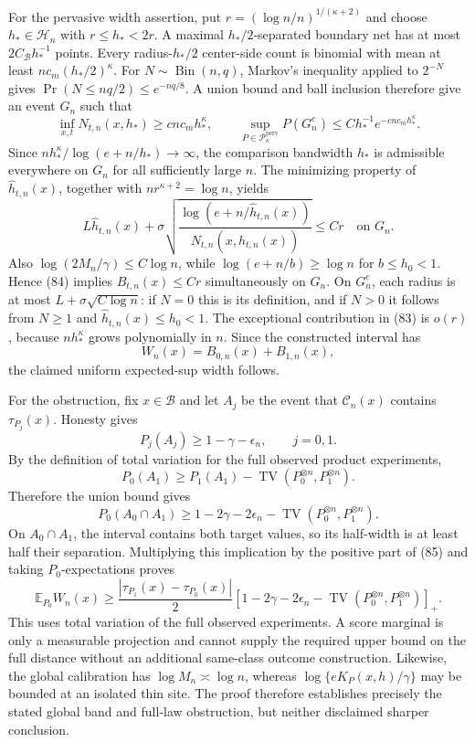 For the pervasive width assertion, put
\(r=(\log n/n)^{1/(\kappa+2)}\) and choose
\(h_*\in\mathcal H_n\) with \(r\le h_*<2r\).  A maximal
\(h_*/2\)-separated boundary net has at most
\(2C_{\mathcal B}h_*^{-1}\) points.  Every radius-\(h_*/2\) center-side
count is binomial with mean at least \(nc_m(h_*/2)^\kappa\).  For
\(N\sim\operatorname{Bin}(n,q)\), Markov's inequality applied to
\(2^{-N}\) gives \(\Pr(N\le nq/2)\le e^{-nq/8}\).  A union bound and
ball inclusion therefore give an event \(G_n\) such that
\[
 \inf_{x,t}N_{t,n}(x,h_*)\ge cn c_mh_*^\kappa,
 \qquad
 \sup_{P\in\mathcal P_\kappa^{\mathrm{perv}}}P(G_n^c)
 \le Ch_*^{-1}e^{-cnc_mh_*^\kappa}. \tag{83}
\]
Since \(nh_*^\kappa/\log(e+n/h_*)\to\infty\), the comparison bandwidth
\(h_*\) is admissible everywhere on \(G_n\) for all sufficiently large
\(n\).  The minimizing property of \(\widehat h_{t,n}(x)\), together
with \(nr^{\kappa+2}=\log n\), yields
\[
 L\widehat h_{t,n}(x)+
 \sigma\sqrt{\frac{\log(e+n/\widehat h_{t,n}(x))}
 {N_{t,n}(x,\widehat h_{t,n}(x))}}
 \le Cr \quad\text{on }G_n. \tag{84}
\]
Also \(\log(2M_n/\gamma)\le C\log n\), while
\(\log(e+n/b)\ge\log n\) for \(b\le h_0<1\).  Hence (84) implies
\(B_{t,n}(x)\le Cr\) simultaneously on \(G_n\).  On \(G_n^c\), each
radius is at most \(L+\sigma\sqrt{C\log n}\): if \(N=0\) this is its
definition, and if \(N>0\) it follows from \(N\ge1\) and
\(\widehat h_{t,n}(x)\le h_0<1\).  The exceptional contribution in
(83) is \(o(r)\), because \(nh_*^\kappa\) grows polynomially in \(n\).
Since the constructed interval has
\[
 W_n(x)=B_{0,n}(x)+B_{1,n}(x),
\]
the claimed uniform expected-sup width follows.

For the obstruction, fix \(x\in\mathcal B\) and let \(A_j\) be the
event that \(\mathcal C_n(x)\) contains \(\tau_{P_j}(x)\).  Honesty gives
\[
 P_j(A_j)\ge1-\gamma-\epsilon_n,
 \qquad j=0,1.
\]
By the definition of total variation for the full observed product
experiments,
\[
 P_0(A_1)\ge P_1(A_1)-
 \operatorname{TV}(P_0^{\otimes n},P_1^{\otimes n}).
\]
Therefore the union bound gives
\[
 P_0(A_0\cap A_1)
 \ge1-2\gamma-2\epsilon_n-
 \operatorname{TV}(P_0^{\otimes n},P_1^{\otimes n}). \tag{85}
\]
On \(A_0\cap A_1\), the interval contains both target values, so its
half-width is at least half their separation.  Multiplying this
implication by the positive part of (85) and taking \(P_0\)-expectations
proves
\[
 \mathbb E_{P_0}W_n(x)
 \ge\frac{|\tau_{P_1}(x)-\tau_{P_0}(x)|}{2}
 \left[1-2\gamma-2\epsilon_n-
 \operatorname{TV}(P_0^{\otimes n},P_1^{\otimes n})\right]_+.
\]
This uses total variation of the full observed experiments.  A score
marginal is only a measurable projection and cannot supply the required
upper bound on the full distance without an additional same-class
outcome construction.  Likewise, the global calibration has
\(\log M_n\asymp\log n\), whereas
\(\log\{eK_P(x,h)/\gamma\}\) may be bounded at an isolated thin site.
The proof therefore establishes precisely the stated global band and
full-law obstruction, but neither disclaimed sharper conclusion.


